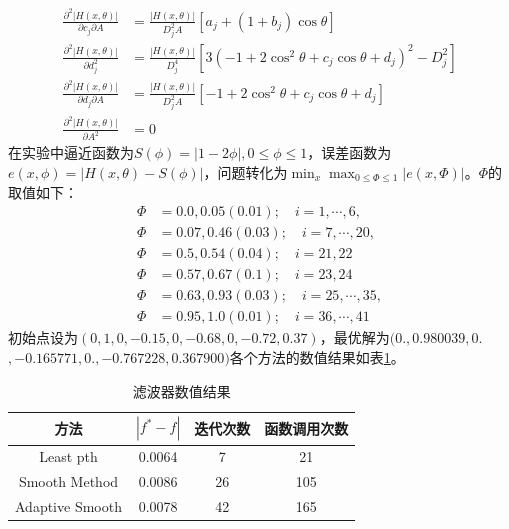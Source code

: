 \documentclass{ctexart}
\begin{document}
$$
\begin{aligned}
	\frac{\partial^2{|H(x,\theta)|}}{\partial{c_j}\partial{A}}&=\frac{|H(x,\theta)|}{D_j^2A}[a_j+(1+b_j)\cos\theta]\\
	\frac{\partial^2{|H(x,\theta)|}}{\partial{d_j^2}}&=\frac{|H(x,\theta)|}{D_j^4}[3(-1+2\cos^2\theta+c_j\cos\theta+d_j)^2-D_j^2]\\
	\frac{\partial^2{|H(x,\theta)|}}{\partial{d_j}\partial{A}}&=\frac{|H(x,\theta)|}{D_j^2A}[-1+2\cos^2\theta+c_j\cos\theta+d_j]\\	
	\frac{\partial^2{|H(x,\theta)|}}{\partial A^2}&=0
\end{aligned}$$
在实验中逼近函数为$S(\phi) = |1-2\phi|,0\leq\phi\leq 1$，误差函数为$e(x,\phi)=|H(x,\theta)-S(\phi)|$，问题转化为$\min_x\max_{0\leq\Phi\leq 1}{|e(x,\Phi)|}$。$\Phi$的取值如下：
$$\begin{aligned}
	\Phi &= 0.0, 0.05(0.01);\quad i=1,\cdots,6,\\
	\Phi &= 0.07, 0.46(0.03);\quad i=7,\cdots,20,\\
	\Phi &= 0.5, 0.54(0.04);\quad i=21,22\\
	\Phi &= 0.57,0.67(0.1);\quad i=23,24\\
	\Phi &= 0.63,0.93(0.03);\quad i=25,\cdots,35,\\
	\Phi &= 0.95,1.0(0.01);\quad i=36,\cdots,41
\end{aligned}$$
初始点设为$(0,1,0,-0.15,0,-0.68,0,-0.72,0.37)$，最优解为$(0.,0.980039,0.$ $,-0.165771,0.,-0.767228,0.367900)$各个方法的数值结果如表\ref{tab:filter}。
\begin{table}[htpb]
	\centering
	\caption{滤波器数值结果}
	\label{tab:filter}
	\begin{tabular}{c c c c}
	\hline
	方法 & $|f^*-f|$ & 迭代次数 & 函数调用次数 \\\hline
	Least pth & 0.0064 & 7 &21 \\
	Smooth Method & 0.0086 & 26 & 105\\
	Adaptive Smooth &0.0078 &42 & 165 \\
	\hline
	\end{tabular}
\end{table}
\end{document}
